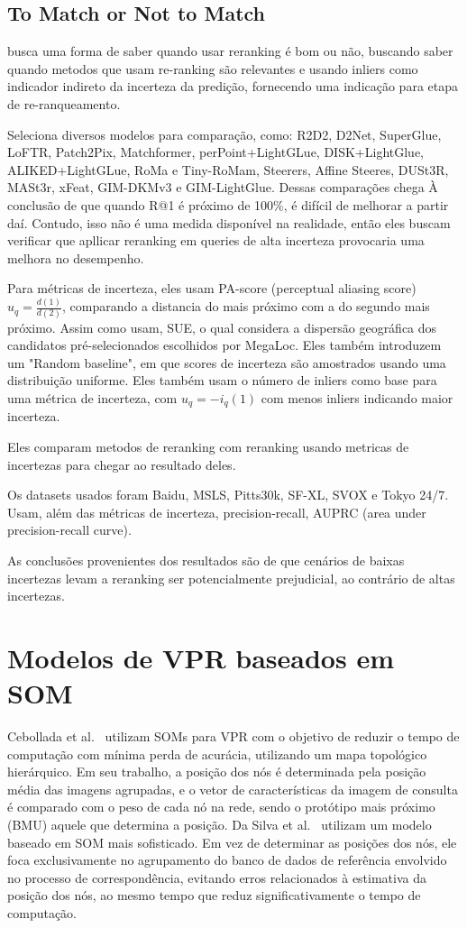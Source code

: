 \documentclass[letterpaper, 10 pt, conference]{ieeeconf}  %
\begin{document}
\subsection{To Match or Not to Match}
\cite{matchnotmatch} busca uma forma de saber quando usar reranking é bom ou não, buscando saber quando metodos que usam re-ranking são relevantes e usando inliers como indicador indireto da incerteza da predição, fornecendo uma indicação para etapa de re-ranqueamento.

Seleciona diversos modelos para comparação, como: R2D2, D2Net, SuperGlue, LoFTR, Patch2Pix, Matchformer, perPoint+LightGLue, DISK+LightGlue, ALIKED+LightGLue, RoMa e Tiny-RoMam, Steerers, Affine Steeres, DUSt3R, MASt3r, xFeat, GIM-DKMv3 e GIM-LightGlue. Dessas comparações chega À conclusão de que quando R@1 é próximo de 100\%, é difícil de melhorar a partir daí. Contudo, isso não é uma medida disponível na realidade, então eles buscam verificar que apllicar reranking em queries de alta incerteza provocaria uma melhora no desempenho. 

Para métricas de incerteza, eles usam PA-score (perceptual aliasing score) $u_q = \frac{d(1)}{d(2)}$, comparando a distancia do mais próximo com a do segundo mais próximo. Assim como usam, SUE, o qual considera a dispersão geográfica dos candidatos pré-selecionados escolhidos por MegaLoc. Eles também introduzem um "Random baseline", em que scores de incerteza são amostrados usando uma distribuição uniforme. Eles também usam o número de inliers como base para uma métrica de incerteza, com $u_q = -i_q(1)$ com menos inliers indicando maior incerteza. 

Eles comparam metodos de reranking com reranking usando metricas de incertezas para chegar ao resultado deles.

Os datasets usados foram Baidu, MSLS, Pitts30k, SF-XL, SVOX e Tokyo 24/7. Usam, além das métricas de incerteza, precision-recall, AUPRC (area under precision-recall curve). 

As conclusões provenientes dos resultados são de que cenários de baixas incertezas levam a reranking ser potencialmente prejudicial, ao contrário de altas incertezas. 


\section{Modelos de VPR baseados em SOM}

Cebollada et al.~\cite{evaluation} utilizam SOMs para \ac{VPR} com o objetivo de reduzir o tempo de computação com mínima perda de acurácia, utilizando um mapa topológico hierárquico. Em seu trabalho, a posição dos nós é determinada pela posição média das imagens agrupadas, e o vetor de características da imagem de consulta é comparado com o peso de cada nó na rede, sendo o protótipo mais próximo (\ac{BMU}) aquele que determina a posição. Da Silva et al.~\cite{scmusom} utilizam um modelo baseado em SOM mais sofisticado. Em vez de determinar as posições dos nós, ele foca exclusivamente no agrupamento do banco de dados de referência envolvido no processo de correspondência, evitando erros relacionados à estimativa da posição dos nós, ao mesmo tempo que reduz significativamente o tempo de computação.  
\end{document}
